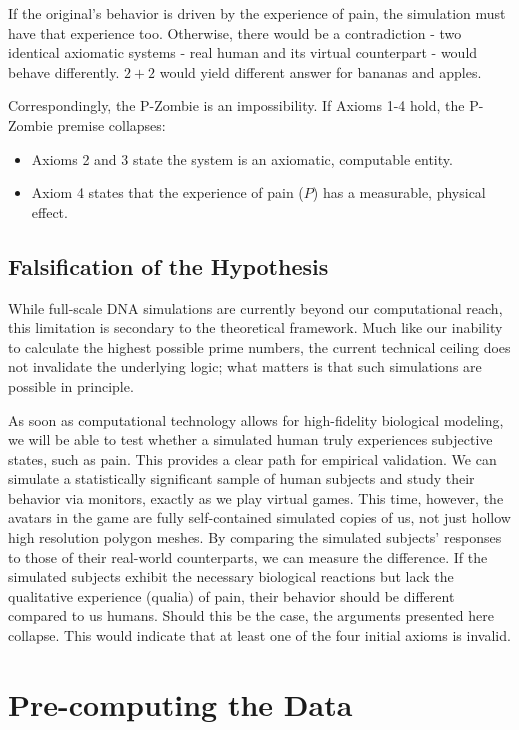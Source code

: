 If the original's behavior is driven by the experience of pain, the simulation must have that experience too.
Otherwise, there would be a contradiction - two identical axiomatic systems - real human and its virtual counterpart - would behave differently.
$2+2$ would yield different answer for bananas and apples.

Correspondingly, the P-Zombie is an impossibility. If Axioms 1-4 hold, the P-Zombie premise collapses:
\begin{itemize}
    \item Axioms 2 and 3 state the system is an axiomatic, computable entity.
    \item Axiom 4 states that the experience of pain ($P$) has a measurable, physical effect.
\end{itemize}


\subsection*{Falsification of the Hypothesis}

While full-scale DNA simulations are currently beyond our computational reach, this limitation is secondary to the theoretical framework.
Much like our inability to calculate the highest possible prime numbers, the current technical ceiling does not invalidate the underlying logic;
what matters is that such simulations are possible in principle.

As soon as computational technology allows for high-fidelity biological modeling, we will be able to test whether a simulated human truly experiences subjective states, such as pain.
This provides a clear path for empirical validation.
We can simulate a statistically significant sample of human subjects and study their behavior via monitors, exactly as we play virtual games.
This time, however, the avatars in the game are fully self-contained simulated copies of us, not just hollow high resolution polygon meshes. 
By comparing the simulated subjects' responses to those of their real-world counterparts, we can measure the difference.
If the simulated subjects exhibit the necessary biological reactions but lack the qualitative experience (qualia) of pain, their behavior should be different compared to us humans.
Should this be the case, the arguments presented here collapse. This would indicate that at least one of the four initial axioms is invalid.



\section{Pre-computing the Data}

